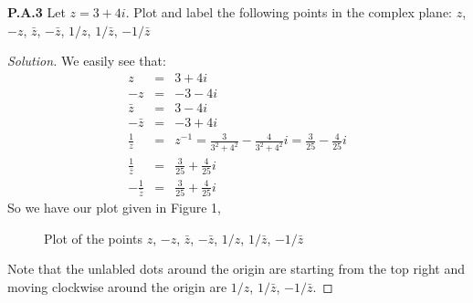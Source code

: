 \documentclass[12pt]{amsart}
\newenvironment{solution}
{\begin{proof}[Solution]}
{\end{proof}}
\begin{document}
\begin{onehalfspace}
        \noindent\textbf{P.A.3} Let $z = 3+4i$. Plot and label the following points in the complex plane: $z$,
        $-z$, $\bar{z}$, $-\bar{z}$, $1/z$, $1/\bar{z}$, $-1/\bar{z}$
        \begin{solution}
            We easily see that:
            \begin{eqnarray*}
                      z & = & 3 + 4i \\
                     -z & = & -3 - 4i \\
                \bar{z} & = & 3 - 4i \\
               -\bar{z} & = & -3 + 4i \\
            \frac{1}{z} & = & z^{-1} = \frac{3}{3^2 + 4^2} - \frac{4}{3^2 + 4^2}i = \frac{3}{25} - \frac{4}{25}i \\
      \frac{1}{\bar{z}} & = & \frac{3}{25} + \frac{4}{25}i \\
     -\frac{1}{\bar{z}} & = & \frac{3}{25} + \frac{4}{25}i
            \end{eqnarray*}
            So we have our plot given in Figure 1,
            \begin{figure}[!ht]
                \centering
                \caption{Plot of the points $z$, $-z$, $\bar{z}$, $-\bar{z}$, $1/z$, $1/\bar{z}$, $-1/\bar{z}$ }
            \end{figure}

            Note that the unlabled dots around the origin are starting from the top right and moving clockwise around
            the origin are $1/z$, $1/\bar{z}$, $-1/\bar{z}$.
        \end{solution}


\end{onehalfspace}
\end{document}
